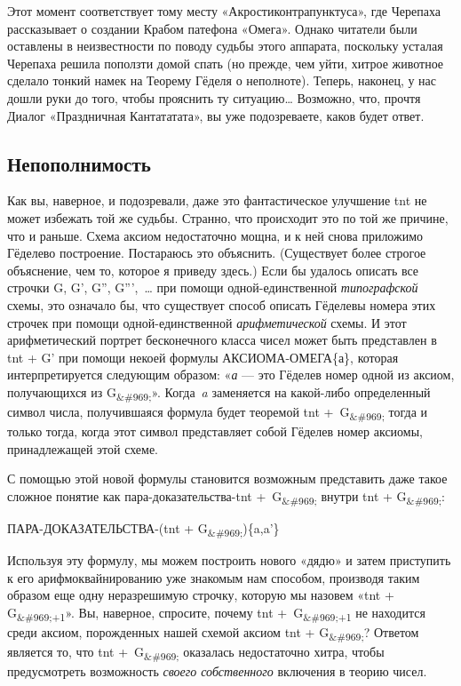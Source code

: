 \documentclass[../main.tex]{subfiles}
\begin{document}
Этот момент соответствует тому месту «Акростиконтрапунктуса», где Черепаха рассказывает о создании Крабом патефона «Омега». Однако читатели были оставлены в неизвестности по поводу судьбы этого аппарата, поскольку усталая Черепаха решила поползти домой спать (но прежде, чем уйти, хитрое животное сделало тонкий намек на Теорему Гёделя о неполноте). Теперь, наконец, у нас дошли руки до того, чтобы прояснить ту ситуацию\ldots{} Возможно, что, прочтя Диалог «Праздничная Кантататата», вы уже подозреваете, каков будет ответ.


\subsection{Непополнимость}

Как вы, наверное, и подозревали, даже это фантастическое улучшение \acs{tnt} не может избежать той же судьбы. Странно, что происходит это по той же причине, что и раньше. Схема аксиом недостаточно мощна, и к ней снова приложимо Гёделево построение. Постараюсь это объяснить. (Существует более строгое объяснение, чем то, которое я приведу здесь.) Если бы удалось описать все строчки G, G', G'', G''',~\ldots{} при помощи одной-единственной \emph{типографской} схемы, это означало бы, что существует способ описать Гёделевы номера этих строчек при помощи одной-единственной \emph{арифметической} схемы. И этот арифметический портрет бесконечного класса чисел может быть представлен в \acs{tnt} + G' при помощи некоей формулы АКСИОМА-ОМЕГА\{а\}, которая интерпретируется следующим образом: «\emph{а} --- это Гёделев номер одной из аксиом, получающихся из G\textsubscript{\&\#969;}». Когда~\emph{a} заменяется на какой-либо определенный символ числа, получившаяся формула будет теоремой \acs{tnt} +~G\textsubscript{\&\#969;} тогда и только тогда, когда этот символ представляет собой Гёделев номер аксиомы, принадлежащей этой схеме.

С помощью этой новой формулы становится возможным представить даже такое сложное понятие как пара-доказательства-\acs{tnt} +~G\textsubscript{\&\#969;} внутри \acs{tnt} + G\textsubscript{\&\#969;}:

ПАРА-ДОКАЗАТЕЛЬСТВА-(\acs{tnt} + G\textsubscript{\&\#969;})\{a,a'\}

Используя эту формулу, мы можем построить нового «дядю» и затем приступить к его арифмоквайнированию уже знакомым нам способом, производя таким образом еще одну неразрешимую строчку, которую мы назовем «\acs{tnt} + G\textsubscript{\&\#969;+1}». Вы, наверное, спросите, почему \acs{tnt} +~G\textsubscript{\&\#969;+1} не находится среди аксиом, порожденных нашей схемой аксиом \acs{tnt} + G\textsubscript{\&\#969;}? Ответом является то, что \acs{tnt} +~G\textsubscript{\&\#969;} оказалась недостаточно хитра, чтобы предусмотреть возможность \emph{своего собственного} включения в теорию чисел.
\end{document}
